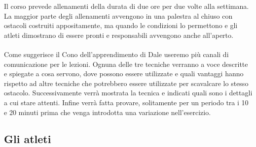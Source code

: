 Il corso prevede allenamenti della durata di due ore per due volte alla settimana. La maggior parte degli allenamenti avvengono in una palestra al chiuso con ostacoli costruiti appositamente, ma quando le condizioni lo permettono e gli atleti dimostrano di essere pronti e responsabili avvengono anche all'aperto.\\
\\
Come suggerisce il Cono dell'apprendimento di Dale useremo più canali di comunicazione per le lezioni. Ognuna delle tre tecniche verranno a voce descritte e spiegate a cosa servono, dove possono essere utilizzate e quali vantaggi hanno rispetto ad altre tecniche che potrebbero essere utilizzate per scavalcare lo stesso ostacolo. Successivamente verrà mostrata la tecnica e indicati quali sono i dettagli a cui stare attenti. Infine verrà fatta provare, solitamente per un periodo tra i 10 e 20 minuti prima che venga introdotta una variazione nell'esercizio.

 \subsection{Gli atleti}

